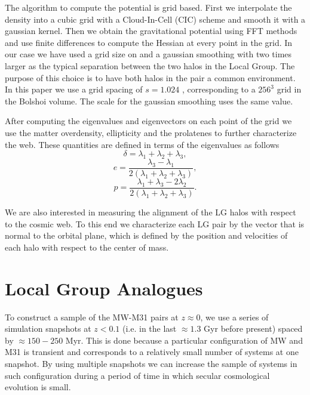 \documentclass{emulateapj}
\newcommand{\hMpc}{{\ifmmode{h^{-1}{\rm Mpc}}\else{$h^{-1}$Mpc }\fi}}
\begin{document}
The algorithm to compute the potential is grid based. First we
interpolate the density into a cubic grid with a Cloud-In-Cell (CIC)
scheme and smooth it with a gaussian kernel. Then we obtain the
gravitational potential using FFT methods and use finite differences
to compute the Hessian at every point in the grid. In our case we have
used a grid size on and a gaussian smoothing with two times larger as
the typical separation between the two halos in the Local Group. The
purpose of this choice is to have both halos in the pair a common
environment. In this paper we use a grid spacing of $s=1.024$ \hMpc,
corresponding to a $256^3$ grid in the Bolshoi volume. The scale for
the gaussian smoothing uses the same value.


After computing the eigenvalues and eigenvectors on each point of the
grid we use the matter overdensity, ellipticity and the prolatenes to
further characterize the web. These quantities are defined in terms of the
eigenvalues as follows 
%
\begin{equation}
\delta = \lambda_1 + \lambda_2 + \lambda_3,
\end{equation}
%
\begin{equation}
e= \frac{\lambda_3 - \lambda_1}{2(\lambda_1 + \lambda_2 + \lambda_3)}, 
\end{equation}
%
\begin{equation}
p= \frac{\lambda_1 + \lambda_3 - 2\lambda_2}{2(\lambda_1 + \lambda_2 +
  \lambda_3)}.
\end{equation}

We are also interested in measuring the alignment of the LG halos with
respect to the cosmic web. To this end we characterize each LG pair by
the vector that is normal to the orbital plane, which is defined by
the position and velocities of each halo with respect to the center of
mass. 


\section{Local Group Analogues}
\label{sec:lg_analogues}

To construct a sample of the MW-M31 pairs at $z\approx 0$, we use a
series of simulation snapshots  at $z<0.1$ (i.e. in the last $\approx
1.3$ Gyr before present) spaced by $\approx 150-250$ Myr. This is done
because a particular configuration of MW and M31 is transient and
corresponds to a relatively small number of systems at one
snapshot. By using multiple snapshots we can increase the sample of
systems in such configuration during a period of time in which secular
cosmological evolution is small. 
\end{document}

